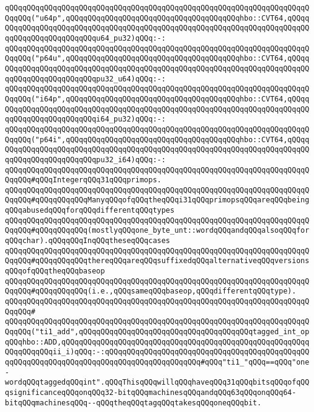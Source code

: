 \verb|qQQqqQQqqQQqqQQqqQQqqQQqqQQqqQQqqQQqqQQqqQQqqQQqqQQqqQQqqQQqqQQqqQQqqQQqqQQq("u64p",qQQqqQQqqQQqqQQqqQQqqQQqqQQqqQQqqQQqqQQqhbo::CVT64,qQQqqQQqqQQqqQQqqQQqqQQqqQQqqQQqqQQqqQQqqQQqqQQqqQQqqQQqqQQqqQQqqQQqqQQqqQQqqQQqqQQqqQQqqQQqqQQqu64_pu32)qQQq:-:|\newline
\verb|qQQqqQQqqQQqqQQqqQQqqQQqqQQqqQQqqQQqqQQqqQQqqQQqqQQqqQQqqQQqqQQqqQQqqQQqqQQq("p64u",qQQqqQQqqQQqqQQqqQQqqQQqqQQqqQQqqQQqqQQqhbo::CVT64,qQQqqQQqqQQqqQQqqQQqqQQqqQQqqQQqqQQqqQQqqQQqqQQqqQQqqQQqqQQqqQQqqQQqqQQqqQQqqQQqqQQqqQQqqQQqqQQqpu32_u64)qQQq:-:|\newline
\verb|qQQqqQQqqQQqqQQqqQQqqQQqqQQqqQQqqQQqqQQqqQQqqQQqqQQqqQQqqQQqqQQqqQQqqQQqqQQq("i64p",qQQqqQQqqQQqqQQqqQQqqQQqqQQqqQQqqQQqqQQqhbo::CVT64,qQQqqQQqqQQqqQQqqQQqqQQqqQQqqQQqqQQqqQQqqQQqqQQqqQQqqQQqqQQqqQQqqQQqqQQqqQQqqQQqqQQqqQQqqQQqqQQqi64_pu32)qQQq:-:|\newline
\verb|qQQqqQQqqQQqqQQqqQQqqQQqqQQqqQQqqQQqqQQqqQQqqQQqqQQqqQQqqQQqqQQqqQQqqQQqqQQq("p64i",qQQqqQQqqQQqqQQqqQQqqQQqqQQqqQQqqQQqqQQqhbo::CVT64,qQQqqQQqqQQqqQQqqQQqqQQqqQQqqQQqqQQqqQQqqQQqqQQqqQQqqQQqqQQqqQQqqQQqqQQqqQQqqQQqqQQqqQQqqQQqqQQqpu32_i64)qQQq:-:|\newline
\newline
\verb|qQQqqQQqqQQqqQQqqQQqqQQqqQQqqQQqqQQqqQQqqQQqqQQqqQQqqQQqqQQqqQQqqQQqqQQqqQQq#qQQqIntegerqQQq31qQQqprimops.|\newline
\verb|qQQqqQQqqQQqqQQqqQQqqQQqqQQqqQQqqQQqqQQqqQQqqQQqqQQqqQQqqQQqqQQqqQQqqQQqqQQq#qQQqqQQqqQQqManyqQQqofqQQqtheqQQqi31qQQqprimopsqQQqareqQQqbeingqQQqabusedqQQqforqQQqdifferentqQQqtypes|\newline
\verb|qQQqqQQqqQQqqQQqqQQqqQQqqQQqqQQqqQQqqQQqqQQqqQQqqQQqqQQqqQQqqQQqqQQqqQQqqQQq#qQQqqQQqqQQq(mostlyqQQqone_byte_unt::wordqQQqandqQQqalsoqQQqforqQQqchar).qQQqqQQqInqQQqtheseqQQqcases|\newline
\verb|qQQqqQQqqQQqqQQqqQQqqQQqqQQqqQQqqQQqqQQqqQQqqQQqqQQqqQQqqQQqqQQqqQQqqQQqqQQq#qQQqqQQqqQQqthereqQQqareqQQqsuffixedqQQqalternativeqQQqversionsqQQqofqQQqtheqQQqbaseop|\newline
\verb|qQQqqQQqqQQqqQQqqQQqqQQqqQQqqQQqqQQqqQQqqQQqqQQqqQQqqQQqqQQqqQQqqQQqqQQqqQQq#qQQqqQQqqQQq(i.e.,qQQqsameqQQqbaseop,qQQqdifferentqQQqtype).|\newline
\verb|qQQqqQQqqQQqqQQqqQQqqQQqqQQqqQQqqQQqqQQqqQQqqQQqqQQqqQQqqQQqqQQqqQQqqQQqqQQq#|\newline
\verb|qQQqqQQqqQQqqQQqqQQqqQQqqQQqqQQqqQQqqQQqqQQqqQQqqQQqqQQqqQQqqQQqqQQqqQQqqQQq("ti1_add",qQQqqQQqqQQqqQQqqQQqqQQqqQQqqQQqqQQqqQQqtagged_int_opqQQqhbo::ADD,qQQqqQQqqQQqqQQqqQQqqQQqqQQqqQQqqQQqqQQqqQQqqQQqqQQqqQQqqQQqqQQqqQQqii_i)qQQq:-:qQQqqQQqqQQqqQQqqQQqqQQqqQQqqQQqqQQqqQQqqQQqqQQqqQQqqQQqqQQqqQQqqQQqqQQqqQQqqQQqqQQqqQQqqQQq#qQQq"ti1_"qQQq==qQQq"one-wordqQQqtaggedqQQqint".qQQqThisqQQqwillqQQqhaveqQQq31qQQqbitsqQQqofqQQqsignificanceqQQqonqQQq32-bitqQQqmachinesqQQqandqQQq63qQQqonqQQq64-bitqQQqmachinesqQQq--qQQqtheqQQqtagqQQqtakesqQQqoneqQQqbit.|\newline
